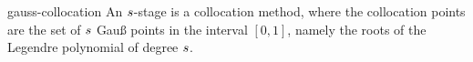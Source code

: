 \begin{Definition}{gauss-collocation}
   An $s$-stage
   is a collocation method, where the
  collocation points are the set of $s$ Gauß points in the interval
  $[0,1]$, namely the roots of the Legendre polynomial of degree $s$.
\end{Definition}
